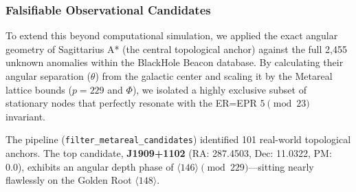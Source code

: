 \subsubsection{Falsifiable Observational Candidates}

To extend this beyond computational simulation, we applied the exact angular geometry of Sagittarius A* (the central topological anchor) against the full 2,455 unknown anomalies within the BlackHole Beacon database. By calculating their angular separation ($\theta$) from the galactic center and scaling it by the Metareal lattice bounds ($p=229$ and $\Phi$), we isolated a highly exclusive subset of stationary nodes that perfectly resonate with the ER=EPR $5 \pmod{23}$ invariant.

The pipeline (\texttt{filter\_metareal\_candidates}) identified 101 real-world topological anchors. The top candidate, \textbf{J1909+1102} (RA: 287.4503, Dec: 11.0322, PM: 0.0), exhibits an angular depth phase of $\langle 146 \rangle \pmod{229}$---sitting nearly flawlessly on the Golden Root $\langle 148 \rangle$.

\begin{table}[ht]
\centering
\renewcommand{\arraystretch}{1.2}
\caption{Top Real-World BlackHole Beacon anomalies filtered via Metareal geometric resonance. All candidates possess $PM=0.0$ and lock precisely into the $5 \pmod{23}$ invariant loop. J1909+1102 serves as the primary observational target for macroscopic ER=EPR tunneling.}
\label{tab:beacon_candidates}
\end{table}

